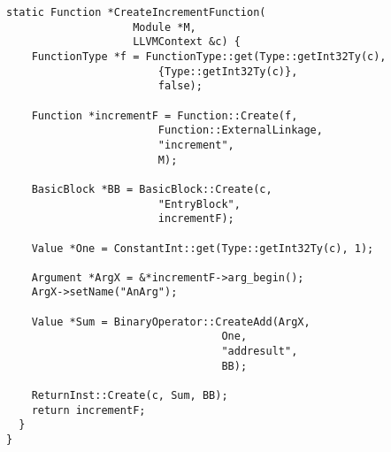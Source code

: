 \begin{lstlisting}[float,floatplacement=H,
  caption={Generating MCJIT IR for the increment program.},
  label=lst:llvm_increment]
  static Function *CreateIncrementFunction(
                    Module *M, 
                    LLVMContext &c) {
    FunctionType *f = FunctionType::get(Type::getInt32Ty(c), 
                        {Type::getInt32Ty(c)}, 
                        false);
    
    Function *incrementF = Function::Create(f, 
                        Function::ExternalLinkage, 
                        "increment", 
                        M);

    BasicBlock *BB = BasicBlock::Create(c, 
                        "EntryBlock", 
                        incrementF);
    
    Value *One = ConstantInt::get(Type::getInt32Ty(c), 1);
    
    Argument *ArgX = &*incrementF->arg_begin(); 
    ArgX->setName("AnArg");
  
    Value *Sum = BinaryOperator::CreateAdd(ArgX, 
                                  One,
                                  "addresult", 
                                  BB);
  
    ReturnInst::Create(c, Sum, BB);
    return incrementF;
  }
}\end{lstlisting}

